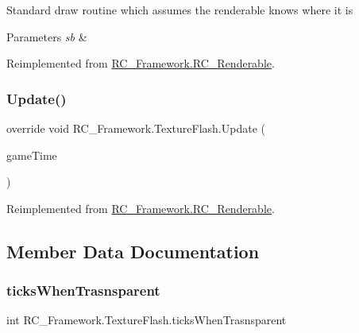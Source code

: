 Standard draw routine which assumes the renderable knows where it is 


\begin{DoxyParams}{Parameters}
{\em sb} & \\
\hline
\end{DoxyParams}


Reimplemented from \mbox{\hyperlink{class_r_c___framework_1_1_r_c___renderable_acc26db34e382a25a989c4c0dd0354b23}{R\+C\+\_\+\+Framework.\+R\+C\+\_\+\+Renderable}}.

\mbox{\label{class_r_c___framework_1_1_texture_flash_a84925900306ae16e7838be3a4620b2a7}} 
\subsubsection{\texorpdfstring{Update()}{Update()}}
{\footnotesize\ttfamily override void R\+C\+\_\+\+Framework.\+Texture\+Flash.\+Update (\begin{DoxyParamCaption}\item[{Game\+Time}]{game\+Time }\end{DoxyParamCaption})\hspace{0.3cm}{\ttfamily [virtual]}}



Reimplemented from \mbox{\hyperlink{class_r_c___framework_1_1_r_c___renderable_a5745bedc7ba0587aa1e1d8563c357228}{R\+C\+\_\+\+Framework.\+R\+C\+\_\+\+Renderable}}.



\subsection{Member Data Documentation}
\mbox{\label{class_r_c___framework_1_1_texture_flash_a97c2fc82f60a04f2a362a1b5c938500f}} 
\subsubsection{\texorpdfstring{ticks\+When\+Trasnsparent}{ticksWhenTrasnsparent}}
{\footnotesize\ttfamily int R\+C\+\_\+\+Framework.\+Texture\+Flash.\+ticks\+When\+Trasnsparent}

